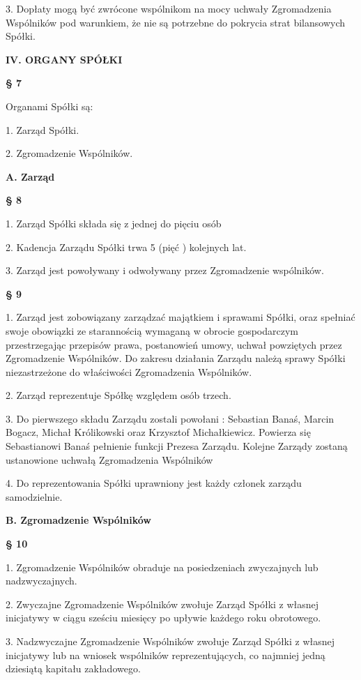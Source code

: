 3.      Dopłaty mogą być zwrócone wspólnikom na mocy uchwały Zgromadzenia Wspólników pod warunkiem, że nie są potrzebne do pokrycia strat bilansowych Spółki.\\

\centerline{\large\textbf{IV. ORGANY SPÓŁKI}}


\centerline{\large\textbf{§ 7}}

Organami Spółki są:

1. Zarząd Spółki.

2. Zgromadzenie Wspólników.\\

\centerline{\large\textbf{A. Zarząd}}


\centerline{\large\textbf{§ 8}}

1. Zarząd Spółki składa się z jednej do pięciu osób

2. Kadencja Zarządu Spółki trwa 5 (pięć ) kolejnych lat.

3. Zarząd jest powoływany i odwoływany przez Zgromadzenie wspólników.
\\
\centerline{\large\textbf{§ 9}}

1. Zarząd jest zobowiązany zarządzać majątkiem i sprawami Spółki, oraz spełniać swoje obowiązki ze starannością wymaganą w obrocie gospodarczym przestrzegając przepisów prawa, postanowień umowy, uchwał powziętych przez Zgromadzenie Wspólników. Do zakresu działania Zarządu należą sprawy Spółki niezastrzeżone do właściwości Zgromadzenia Wspólników.

2. Zarząd reprezentuje Spółkę względem osób trzech.

3. Do pierwszego składu Zarządu zostali powołani : Sebastian Banaś, Marcin Bogacz, Michał Królikowski oraz Krzysztof Michałkiewicz. Powierza się Sebastianowi Banaś pełnienie funkcji Prezesa Zarządu. Kolejne Zarządy zostaną ustanowione uchwałą Zgromadzenia Wspólników

4. Do reprezentowania Spółki uprawniony jest każdy członek zarządu samodzielnie.

\centerline{\large\textbf{B. Zgromadzenie Wspólników}}


\centerline{\large\textbf{§ 10}}

1. Zgromadzenie Wspólników obraduje na posiedzeniach zwyczajnych lub nadzwyczajnych.

2. Zwyczajne Zgromadzenie Wspólników zwołuje Zarząd Spółki z własnej inicjatywy w ciągu sześciu miesięcy po upływie każdego roku obrotowego.

3. Nadzwyczajne Zgromadzenie Wspólników zwołuje Zarząd Spółki z własnej inicjatywy lub na wniosek wspólników reprezentujących, co najmniej jedną dziesiątą kapitału zakładowego.

